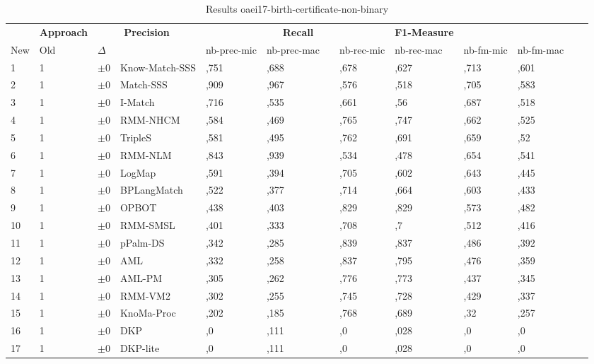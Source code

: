 \begin{table}[htb]
\setlength{\tabcolsep}{0.5em}
\centering
\scriptsize
\begin{tabular}[tb]{lllp{2.3cm}llllllllll}
\noalign{\smallskip}\hline\noalign{\smallskip}
\multicolumn{3}{c}{\textbf{Rank}}& \textbf{Approach}  & \multicolumn{2}{c}{\textbf{Precision}}  & \hspace*{1mm}  & \multicolumn{2}{c}{\textbf{Recall}}  & \hspace*{1mm}  & \multicolumn{2}{c}{\textbf{F1-Measure}}  & \hspace*{1mm} \\
New & Old & $\Delta$ & &nb-prec-mic & nb-prec-mac && nb-rec-mic & nb-rec-mac && nb-fm-mic & nb-fm-mac\\
\noalign{\smallskip}\hline\noalign{\smallskip}
1 & 1 		& $\pm$0 &Know-Match-SSS    	&	,751 & ,688 & & ,678 & ,627 & & ,713 & ,601\\
2 & 1 		& $\pm$0 &Match-SSS    	&	,909 & ,967 & & ,576 & ,518 & & ,705 & ,583\\
3 & 1 		& $\pm$0 &I-Match    	&	,716 & ,535 & & ,661 & ,56 & & ,687 & ,518\\
4 & 1 		& $\pm$0 &RMM-NHCM    	&	,584 & ,469 & & ,765 & ,747 & & ,662 & ,525\\
5 & 1 		& $\pm$0 &TripleS    	&	,581 & ,495 & & ,762 & ,691 & & ,659 & ,52\\
6 & 1 		& $\pm$0 &RMM-NLM    	&	,843 & ,939 & & ,534 & ,478 & & ,654 & ,541\\
7 & 1 		& $\pm$0 &LogMap    	&	,591 & ,394 & & ,705 & ,602 & & ,643 & ,445\\
8 & 1 		& $\pm$0 &BPLangMatch    	&	,522 & ,377 & & ,714 & ,664 & & ,603 & ,433\\
9 & 1 		& $\pm$0 &OPBOT    	&	,438 & ,403 & & ,829 & ,829 & & ,573 & ,482\\
10 & 1 		& $\pm$0 &RMM-SMSL    	&	,401 & ,333 & & ,708 & ,7 & & ,512 & ,416\\
11 & 1 		& $\pm$0 &pPalm-DS    	&	,342 & ,285 & & ,839 & ,837 & & ,486 & ,392\\
12 & 1 		& $\pm$0 &AML    	&	,332 & ,258 & & ,837 & ,795 & & ,476 & ,359\\
13 & 1 		& $\pm$0 &AML-PM    	&	,305 & ,262 & & ,776 & ,773 & & ,437 & ,345\\
14 & 1 		& $\pm$0 &RMM-VM2    	&	,302 & ,255 & & ,745 & ,728 & & ,429 & ,337\\
15 & 1 		& $\pm$0 &KnoMa-Proc    	&	,202 & ,185 & & ,768 & ,689 & & ,32 & ,257\\
16 & 1 		& $\pm$0 &DKP    	&	,0 & ,111 & & ,0 & ,028 & & ,0 & ,0\\
17 & 1 		& $\pm$0 &DKP-lite    	&	,0 & ,111 & & ,0 & ,028 & & ,0 & ,0\\
\end{tabular}
\caption{Results oaei17-birth-certificate-non-binary}
\label{tbl:results}
\end{table}